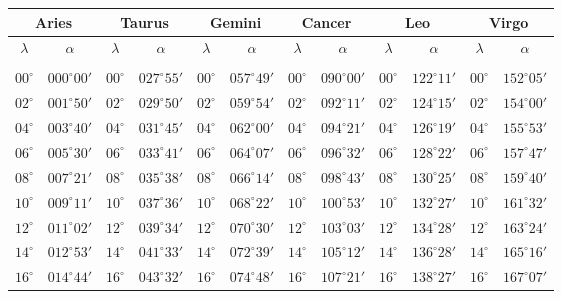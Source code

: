 \clearpage
\begin{table}[!h]
\vspace{0.25cm}
\centering
{\scriptsize\begin{tabular}{cc|cc|cc|cc|cc|cc}
\multicolumn{2}{c}{Aries}\vline & \multicolumn{2}{c}{Taurus} \vline& \multicolumn{2}{c}{Gemini} \vline& \multicolumn{2}{c}{Cancer}\vline &
\multicolumn{2}{c}{Leo}\vline & \multicolumn{2}{c}{Virgo}\\\hline
$\lambda$& $\alpha$& $\lambda$& $\alpha$& $\lambda$& $\alpha$& $\lambda$& $\alpha$& $\lambda$& $\alpha$& $\lambda$& $\alpha$\\\hline
&&&&&&&&&&&\\[-2ex]
$00^\circ$ & $000^\circ00'$ & $00^\circ$ & $027^\circ55'$ & $00^\circ$ & $057^\circ49'$ & $00^\circ$ & $090^\circ00'$ & $00^\circ$ & $122^\circ11'$ & $00^\circ$ & $152^\circ05'$\\
$02^\circ$ & $001^\circ50'$ & $02^\circ$ & $029^\circ50'$ & $02^\circ$ & $059^\circ54'$ & $02^\circ$ & $092^\circ11'$ & $02^\circ$ & $124^\circ15'$ & $02^\circ$ & $154^\circ00'$\\
$04^\circ$ & $003^\circ40'$ & $04^\circ$ & $031^\circ45'$ & $04^\circ$ & $062^\circ00'$ & $04^\circ$ & $094^\circ21'$ & $04^\circ$ & $126^\circ19'$ & $04^\circ$ & $155^\circ53'$\\
$06^\circ$ & $005^\circ30'$ & $06^\circ$ & $033^\circ41'$ & $06^\circ$ & $064^\circ07'$ & $06^\circ$ & $096^\circ32'$ & $06^\circ$ & $128^\circ22'$ & $06^\circ$ & $157^\circ47'$\\
$08^\circ$ & $007^\circ21'$ & $08^\circ$ & $035^\circ38'$ & $08^\circ$ & $066^\circ14'$ & $08^\circ$ & $098^\circ43'$ & $08^\circ$ & $130^\circ25'$ & $08^\circ$ & $159^\circ40'$\\
$10^\circ$ & $009^\circ11'$ & $10^\circ$ & $037^\circ36'$ & $10^\circ$ & $068^\circ22'$ & $10^\circ$ & $100^\circ53'$ & $10^\circ$ & $132^\circ27'$ & $10^\circ$ & $161^\circ32'$\\
$12^\circ$ & $011^\circ02'$ & $12^\circ$ & $039^\circ34'$ & $12^\circ$ & $070^\circ30'$ & $12^\circ$ & $103^\circ03'$ & $12^\circ$ & $134^\circ28'$ & $12^\circ$ & $163^\circ24'$\\
$14^\circ$ & $012^\circ53'$ & $14^\circ$ & $041^\circ33'$ & $14^\circ$ & $072^\circ39'$ & $14^\circ$ & $105^\circ12'$ & $14^\circ$ & $136^\circ28'$ & $14^\circ$ & $165^\circ16'$\\
$16^\circ$ & $014^\circ44'$ & $16^\circ$ & $043^\circ32'$ & $16^\circ$ & $074^\circ48'$ & $16^\circ$ & $107^\circ21'$ & $16^\circ$ & $138^\circ27'$ & $16^\circ$ & $167^\circ07'$\\

\end{tabular}}
\end{table}
